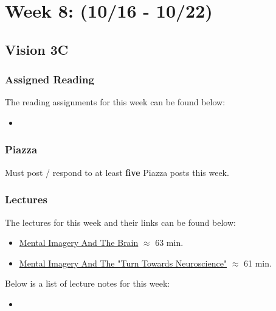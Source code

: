 \clearpage
\chapter{Week 8: (10/16 - 10/22)}

\section{Vision 3C}

\subsection{Assigned Reading}

The reading assignments for this week can be found below:

\begin{itemize}
    \item {}
\end{itemize}

\subsection{Piazza}

Must post / respond to at least \textbf{five} Piazza posts this week.  

\subsection{Lectures}

The lectures for this week and their links can be found below:

\begin{itemize}
    \item \href{https://applied.cs.colorado.edu/mod/hvp/view.php?id=49385}{Mental Imagery And The Brain} $\approx$ 63 min.
    \item \href{https://applied.cs.colorado.edu/mod/hvp/view.php?id=49386}{Mental Imagery And The "Turn Towards Neuroscience"} $\approx$ 61 min.
\end{itemize}

\noindent Below is a list of lecture notes for this week:

\begin{itemize}
    \item {}
\end{itemize}

